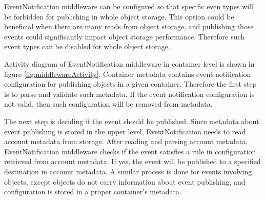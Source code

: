     EventNotification middleware can be configured so that specific even types will be forbidden for publishing in whole object storage. This option could be beneficial when there are many reads from object storage, and publishing those events could significantly impact object storage performance. Therefore such event types can be disabled for whole object storage.

    Activity diagram of EventNotification middleware in container level is shown in figure \ref{fig:middlewareActivity}. Container metadata contains event notification configuration for publishing objects in a given container. Therefore the first step is to parse and validate such metadata. If the event notification configuration is not valid, then such configuration will be removed from metadata.

    The next step is deciding if the event should be published. Since metadata about event publishing is stored in the upper level, EventNotification needs to read account metadata from storage. After reading and parsing account metadata, EventNotification middleware checks if the event satisfies a rule in configuration retrieved from account metadata. If yes, the event will be published to a specified destination in account metadata. A similar process is done for events involving objects, except objects do not carry information about event publishing, and configuration is stored in a proper container's metadata.


